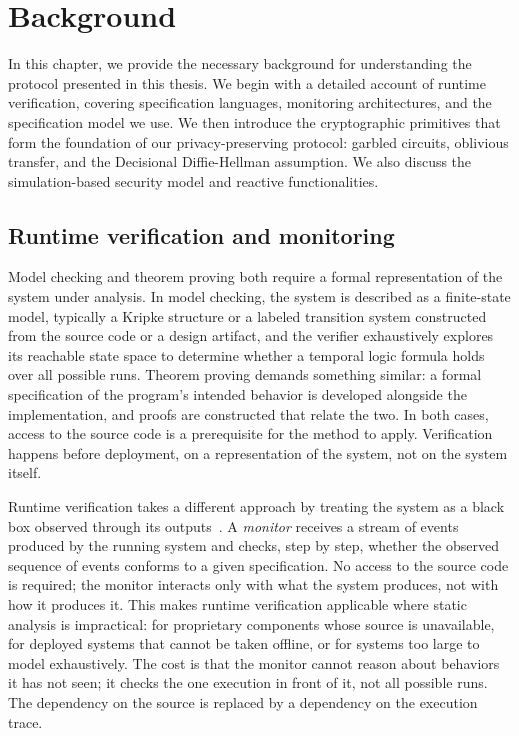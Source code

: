\chapter{Background}\label{ch:background}

In this chapter, we provide the necessary background for understanding the protocol presented in this thesis. We begin with a detailed account of runtime verification, covering specification languages, monitoring architectures, and the specification model we use. We then introduce the cryptographic primitives that form the foundation of our privacy-preserving protocol: garbled circuits, oblivious transfer, and the Decisional Diffie-Hellman assumption. We also discuss the simulation-based security model and reactive functionalities.

\section{Runtime verification and monitoring}\label{sec:rv}

Model checking and theorem proving both require a formal representation of the system under analysis. In model checking, the system is described as a finite-state model, typically a Kripke structure or a labeled transition system constructed from the source code or a design artifact, and the verifier exhaustively explores its reachable state space to determine whether a temporal logic formula holds over all possible runs. Theorem proving demands something similar: a formal specification of the program's intended behavior is developed alongside the implementation, and proofs are constructed that relate the two. In both cases, access to the source code is a prerequisite for the method to apply. Verification happens before deployment, on a representation of the system, not on the system itself.

Runtime verification takes a different approach by treating the system as a black box observed through its outputs~\cite{LS09,BFFR18}. A \emph{monitor} receives a stream of events produced by the running system and checks, step by step, whether the observed sequence of events conforms to a given specification. No access to the source code is required; the monitor interacts only with what the system produces, not with how it produces it. This makes runtime verification applicable where static analysis is impractical: for proprietary components whose source is unavailable, for deployed systems that cannot be taken offline, or for systems too large to model exhaustively. The cost is that the monitor cannot reason about behaviors it has not seen; it checks the one execution in front of it, not all possible runs. The dependency on the source is replaced by a dependency on the execution trace.

